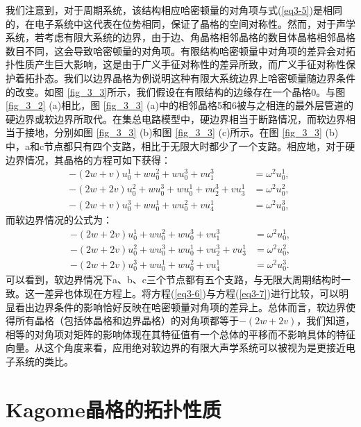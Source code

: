 我们注意到，对于周期系统，该结构相应哈密顿量的对角项与式(\ref{eq3-5})是相同的，在电子系统中这代表在位势相同，保证了晶格的空间对称性。然而，对于声学系统，若考虑有限大系统的边界，由于边、角晶格相邻晶格的数目体晶格相邻晶格数目不同，这会导致哈密顿量的对角项。有限结构哈密顿量中对角项的差异会对拓扑性质产生巨大影响，这是由于广义手征对称性的差异所致，而广义手征对称性保护着拓扑态。我们以边界晶格为例说明这种有限大系统边界上哈密顿量随边界条件的改变。如图 \ref{fig_3_3}所示，我们假设在有限结构的边缘存在一个晶格0。与图 \ref{fig_3_2} (a)相比，图 \ref{fig_3_3} (a)中的相邻晶格5和6被与之相连的最外层管道的硬边界或软边界所取代。在集总电路模型中，硬边界相当于断路情况，而软边界相当于接地，分别如图 \ref{fig_3_3} (b)和图 \ref{fig_3_3} (c)所示。在图 \ref{fig_3_3} (b)中，a和c节点都只有四个支路，相比于无限大时都少了一个支路。相应地，对于硬边界情况，其晶格的方程可如下获得：
\begin{subequations}\label{eq3-6}
  \begin{align}
  -(2w + v)u_{0}^{1} + wu_{0}^{2} + wu_{0}^{3} + vu_{1}^{3} &= \omega^{2}u_{0}^{1}, \\
  -(2w + 2v)u_{0}^{2} + wu_{0}^{3} + wu_{0}^{1} + vu_{2}^{3} + vu_{3}^{1} &= \omega^{2}u_{0}^{2}, \\
  -(2w + v)u_{0}^{3} + wu_{0}^{1} + wu_{0}^{2} + vu_{4}^{1} &= \omega^{2}u_{0}^{3}, \
  \end{align}
\end{subequations}
而软边界情况的公式为：
\begin{subequations}\label{eq3-7}
  \begin{align}
  -(2w + 2v)u_{0}^{1} + wu_{0}^{2} + wu_{0}^{3} + vu_{1}^{3} &= \omega^{2}u_{0}^{1}, \\
  -(2w + 2v)u_{0}^{2} + wu_{0}^{3} + wu_{0}^{1} + vu_{2}^{3} + vu_{3}^{1} &= \omega^{2}u_{0}^{2}, \\
  -(2w + 2v)u_{0}^{3} + wu_{0}^{1} + wu_{0}^{2} + vu_{4}^{1} &= \omega^{2}u_{0}^{3}. 
  \end{align}
\end{subequations}
可以看到，软边界情况下a、b、c三个节点都有五个支路，与无限大周期结构时一致。这一差异也体现在方程上。将方程(\ref{eq3-6})与方程(\ref{eq3-7})进行比较，可以明显看出边界条件的影响恰好反映在哈密顿量对角项的差异上。总体而言，软边界使得所有晶格（包括体晶格和边界晶格）的对角项都等于$-(2w + 2v)$，我们知道，相等的对角项对矩阵的影响体现在其特征值有一个总体的平移而不影响具体的特征向量。从这个角度来看，应用绝对软边界的有限大声学系统可以被视为是更接近电子系统的类比。

\section{Kagome晶格的拓扑性质}

